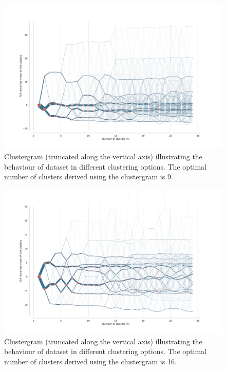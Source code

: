 \begin{figure}
    \includegraphics[width=\linewidth]{figures/clustergram_hou.pdf}
    \caption{Clustergram (truncated along the vertical axis) illustrating the behaviour of dataset in different clustering options. The optimal number of clusters derived using the clustergram is 9.}
    \label{fig:cgram_hou}
\end{figure}

\begin{figure}
    \includegraphics[width=\linewidth]{figures/clustergram_sin.pdf}
    \caption{Clustergram (truncated along the vertical axis) illustrating the behaviour of dataset in different clustering options. The optimal number of clusters derived using the clustergram is 16.}
    \label{fig:cgram_sin}
\end{figure}